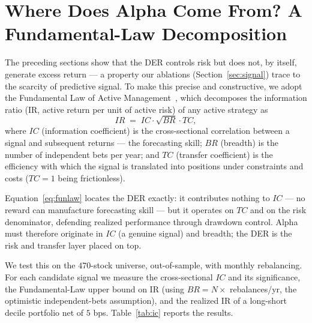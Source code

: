 \documentclass[11pt]{article}
\theoremstyle{definition}
\begin{document}
\section{Where Does Alpha Come From? A Fundamental-Law Decomposition}\label{sec:alpha}

The preceding sections show that the DER controls risk but does not, by itself,
generate excess return --- a property our ablations (Section~\ref{sec:signal}) trace
to the scarcity of predictive signal. To make this precise and constructive, we adopt
the Fundamental Law of Active Management~\cite{grinold1989,clarke2002}, which decomposes
the information ratio (IR, active return per unit of active risk) of any active strategy
as
\begin{equation}
IR \;=\; IC \cdot \sqrt{BR} \cdot TC,
\label{eq:funlaw}
\end{equation}
where $IC$ (information coefficient) is the cross-sectional correlation between a signal
and subsequent returns --- the forecasting skill; $BR$ (breadth) is the number of
independent bets per year; and $TC$ (transfer coefficient) is the efficiency with which
the signal is translated into positions under constraints and costs ($TC=1$ being
frictionless).

Equation~\eqref{eq:funlaw} locates the DER exactly: it contributes nothing to $IC$ ---
no reward can manufacture forecasting skill --- but it operates on $TC$ and on the risk
denominator, defending realized performance through drawdown control. Alpha must
therefore originate in $IC$ (a genuine signal) and breadth; the DER is the risk and
transfer layer placed on top.

We test this on the $470$-stock universe, out-of-sample, with monthly rebalancing. For
each candidate signal we measure the cross-sectional $IC$ and its significance, the
Fundamental-Law upper bound on IR (using $BR=N\times$ rebalances/yr, the optimistic
independent-bets assumption), and the realized IR of a long-short decile portfolio net
of $5$ bps. Table~\ref{tab:ic} reports the results.
\end{document}
